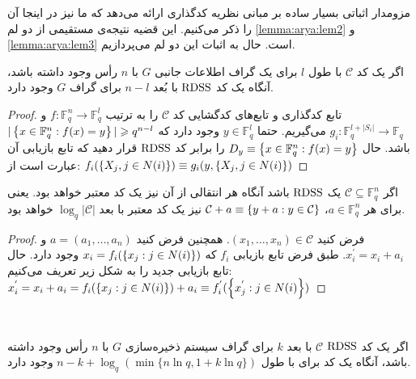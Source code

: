  مزومدار اثباتی بسیار ساده بر مبانی نظریه کدگذاری ارائه می‌دهد که ما نیز در اینجا آن را ذکر می‌کنیم. این قضیه نتیجه‌ی مستقیمی از دو لم
 \autoref{lemma:arya:lem2}
 و
 \autoref{lemma:arya:lem3}
  است. حال به اثبات این دو لم می‌پردازیم.
 \begin{lemma}
 	\label{lemma:arya:lem2}
 	اگر یک کد
 	$\mathcal{C}$
 	با طول
 	$l$
 	برای یک گراف اطلاعات جانبی
 	$G$
 	با
 	$n$
 	رأس وجود داشته باشد، آنگاه یک کد
 	$\mathrm{RDSS}$
 	با بُعد
 	$n - l$
 	برای گراف
 	$G$
 	وجود دارد.
 \end{lemma}
 \begin{proof}
 	تابع کدگذاری و تابع‌های کدگشایی کد
 	$\mathcal{C}$
 	را به ترتیب
 	$f: \mathbb{F}_q^n \rightarrow \mathbb{F}_q^l$
 	و
 	$g_i: \mathbb{F}_q^{l + |S_i|} \rightarrow \mathbb{F}_q$
 	می‌گیریم. حتما
 	$y \in \mathbb{F}_q^{l}$
 	وجود دارد که
 	$|\left\{ x \in \mathbb{F}_q^n: f(x) = y \right\}| \geqslant q^{n - l}$
 	باشد. حال
 	$D_y \equiv \left\{ x \in \mathbb{F}_q^n: f(x) = y \right\}$
  	را برابر کد
 	$\mathrm{RDSS}$
 	قرار دهید که تابع بازیابی آن عبارت است از:
 	$f_i(\left\{ X_j, j \in N(i) \right\}) \equiv g_i(y, \left\{ X_j, j \in N(i) \right\})$
 \end{proof}
 \begin{lemma}
 	\label{lemma:arya:lem4}
 	اگر
 	$\mathcal{C} \subseteq \mathbb{F}_q^n$
 	یک
 	$\mathrm{RDSS}$
 	باشد آنگاه هر انتقالی از آن نیز یک کد معتبر خواهد بود. یعنی برای هر
 	$a \in \mathbb{F}_q^n$،
 	$\mathcal{C} + a \equiv \left\{ y + a: y \in \mathcal{C} \right\}$
 	نیز یک کد معتبر با بعد
 	$\log_q |\mathcal{C}|$
 	خواهد بود.
 \end{lemma}
 \begin{proof}
 	فرض کنید
 	$(x_1, \ldots, x_n) \in \mathcal{C}$.
 	همچنین فرض کنید
 	$a = (a_1, \dots,  a_n)$
 	و
 	$x_i^{'} = x_i + a_i$.
 	طبق فرض تابع بازیابی
 	$f_i$
 	که
 	$x_i = f_i(\left\{ x_j: j \in N(i) \right\})$
 	وجود دارد. حال تابع بازیابی جدید را به شکل زیر تعریف می‌کنیم:
 	$x_i^{'} = x_i +a_i = f_i(\left\{ x_j: j \in N(i) \right\}) + a_i \equiv f_i^{'}(\left\{ x_j^{'}: j \in N(i) \right\})$
 \end{proof}
 ‍\begin{lemma}
 	\label{lemma:arya:lem3}
 	اگر یک کد
 	$\mathrm{RDSS}$ $\mathcal{C}$
 	با بعد
 	$k$
 	برای گراف سیستم ذخیره‌سازی
 	$G$
 	با
 	$n$
 	رأس وجود داشته باشد، آنگاه یک کد برای
 	\icodg
 	با طول 
 	$n - k + \log_q(\min{ \{ n \ln q, 1 + k \ln q\}})$
 	وجود دارد.
 \end{lemma}
